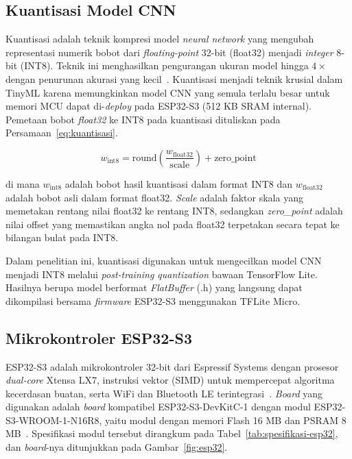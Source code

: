 \subsection{Kuantisasi Model CNN}

Kuantisasi adalah teknik kompresi model \textit{neural network} yang mengubah
representasi numerik bobot dari \textit{floating-point} 32-bit (float32) menjadi
\textit{integer} 8-bit (INT8). Teknik ini menghasilkan pengurangan ukuran model
hingga $4\times$ dengan penurunan akurasi yang kecil~\cite{jacob_2018}. Kuantisasi menjadi teknik krusial dalam
TinyML karena memungkinkan model CNN yang semula terlalu besar untuk memori
MCU dapat di-\textit{deploy} pada ESP32-S3 (512 KB SRAM internal). Pemetaan bobot \textit{float32} ke INT8 pada kuantisasi dituliskan pada Persamaan~\ref{eq:kuantisasi}.

\begin{equation}
\label{eq:kuantisasi}
w_\text{int8} = \text{round}\!\left(\frac{w_\text{float32}}{\text{scale}}\right)
+ \text{zero\_point}
\end{equation}

\noindent di mana $w_\text{int8}$ adalah bobot hasil kuantisasi dalam format
INT8 dan $w_\text{float32}$ adalah bobot asli dalam format float32.
\textit{Scale} adalah faktor skala yang memetakan rentang nilai float32 ke
rentang INT8, sedangkan \textit{zero\_point} adalah nilai offset yang memastikan
angka nol pada float32 terpetakan secara tepat ke bilangan bulat pada INT8.

Dalam penelitian ini, kuantisasi digunakan untuk mengecilkan model CNN
menjadi INT8 melalui \textit{post-training quantization} bawaan TensorFlow
Lite. Hasilnya berupa model berformat \textit{FlatBuffer} (.h) yang langsung
dapat dikompilasi bersama \textit{firmware} ESP32-S3 menggunakan TFLite Micro.

\subsection{Mikrokontroler ESP32-S3}

ESP32-S3 adalah mikrokontroler 32-bit dari Espressif Systems dengan prosesor \textit{dual-core} Xtensa LX7, instruksi vektor (SIMD) untuk mempercepat algoritma kecerdasan buatan, serta WiFi dan Bluetooth LE terintegrasi~\cite{espressif_esp32s3_datasheet}. \textit{Board} yang digunakan adalah \textit{board} kompatibel ESP32-S3-DevKitC-1 dengan modul ESP32-S3-WROOM-1-N16R8, yaitu modul dengan memori Flash 16 MB dan PSRAM 8 MB~\cite{espressif_esp32s3_wroom1}. Spesifikasi modul tersebut dirangkum pada Tabel~\ref{tab:spesifikasi-esp32}, dan \textit{board}-nya ditunjukkan pada Gambar~\ref{fig:esp32}.

